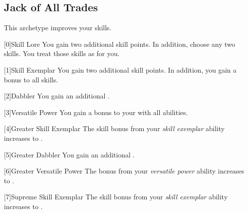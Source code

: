     \newpage
    \subsection{Jack of All Trades}
        This archetype improves your skills.

        [0]{Skill Lore} You gain two additional skill points.
        In addition, choose any two skills.
        You treat those skills as  for you.

        [1]{Skill Exemplar} You gain two additional skill points.
        In addition, you gain a  bonus to all skills.

        [2]{Dabbler} You gain an additional .

        [3]{Versatile Power}
        You gain a  bonus to your  with all abilities.

        [4]{Greater Skill Exemplar} The skill bonus from your \textit{skill exemplar} ability increases to .

        [5]{Greater Dabbler} You gain an additional .

        [6]{Greater Versatile Power} The bonus from your \textit{versatile power} ability increases to .

        [7]{Supreme Skill Exemplar} The skill bonus from your \textit{skill exemplar} ability increases to .




